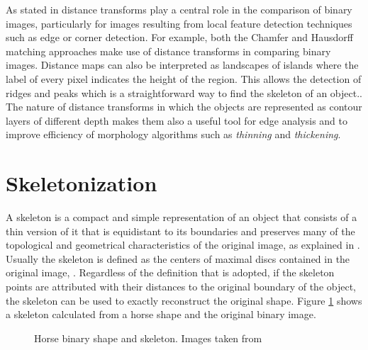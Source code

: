 As stated in \cite{dtresearch2} 
distance transforms play a central role in the comparison of binary images, 
particularly for images resulting from local feature detection techniques such 
as edge or corner detection. For example, both the Chamfer
and Hausdorff matching approaches make use of distance transforms in comparing binary images. 
Distance maps can also be interpreted as landscapes of islands 
where the label of every pixel indicates the height of the region. This allows
the detection of ridges and peaks which is a straightforward way to find the
skeleton of an object.\cite[237]{ridgedt}. The nature of distance transforms
in which the objects are represented as contour layers of different depth
makes them also a useful tool for edge analysis and to improve efficiency of 
morphology algorithms such as \emph{thinning} and \emph{thickening}.\\

\section{Skeletonization}
\label{sec:skeletonization}

A skeleton is a compact and simple representation of an object that consists of a thin
version of it that is equidistant to its boundaries and preserves many of
the topological and geometrical characteristics of the original image, as explained in
\cite{wikipedia:skeleton,ssm,augmented}. Usually the skeleton is defined as the centers
of maximal discs contained in the original image, \cite{ssm,augmented}.
Regardless of the definition that is adopted, if the skeleton points are attributed with their distances
to the original boundary of the object, the skeleton can be used to exactly 
reconstruct the original shape. Figure \ref{fig:genskeleton} shows a skeleton calculated
from a horse shape and the original binary image.\\

\begin{figure}[h t b p ! H]
  \centering
\qquad
  \caption[Horse binary shape and skeleton]{Horse binary shape and skeleton. 
Images taken from \cite{ssm}}
  \label{fig:genskeleton}
\end{figure}


